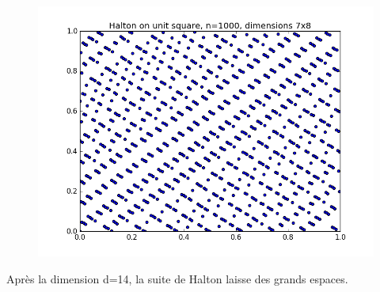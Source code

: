\documentclass[12pt]{report}
\begin{document}
\begin{figure}[!h]
\centering
\includegraphics[scale=0.5]{figure_2-halton-dimensions 6 8.png}
\end{figure}
\newpage
Après la dimension d=14, la suite de Halton laisse des grands espaces.
\end{document}
